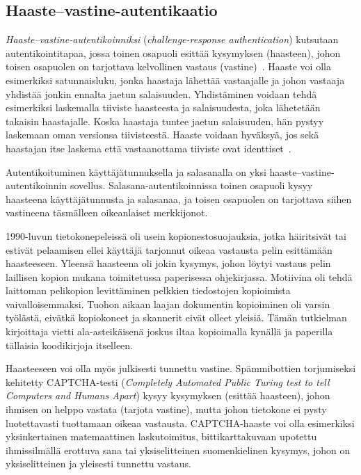 \documentclass[finnish,gradu]{tktltiki}
\begin{document}


  \subsection{Haaste--vastine-autentikaatio} %
  \label{sub:haaste_vastine_autentikaatio}

  \emph{Haaste--vastine-autentikoinniksi} (\emph{challenge-response authentication}) kutsutaan autentikointitapaa, jossa toinen osapuoli esittää kysymyksen (haasteen), johon toisen osapuolen on tarjottava kelvollinen vastaus (vastine)~\cite{NIST_SP800-63-1}. Haaste voi olla esimerkiksi satunnaisluku, jonka haastaja lähettää vastaajalle ja johon vastaaja yhdistää jonkin ennalta jaetun salaisuuden. Yhdistäminen voidaan tehdä esimerkiksi laskemalla tiiviste haasteesta ja salaisuudesta, joka lähetetään takaisin haastajalle. Koska haastaja tuntee jaetun salaisuuden, hän pystyy laskemaan oman versionsa tiivisteestä. Haaste voidaan hyväksyä, jos sekä haastajan itse laskema että vastaanottama tiiviste ovat identtiset~\cite{NIST_SP800-63-1}.

  Autentikoituminen käyttäjätunnuksella ja salasanalla on yksi haaste--vastine-autentikoinnin sovellus. Salasana-autentikoinnissa toinen osapuoli kysyy haasteena käyttäjätunnusta ja salasanaa, ja toisen osapuolen on tarjottava siihen vastineena täsmälleen oikeanlaiset merkkijonot.

  1990-luvun tietokonepeleissä oli usein kopionestosuojauksia, jotka häiritsivät tai estivät pelaamisen ellei käyttäjä tarjonnut oikeaa vastausta pelin esittämään haasteeseen. Yleensä haasteena oli jokin kysymys, johon löytyi vastaus pelin laillisen kopion mukana toimitetussa paperisessa ohjekirjassa. Motiivina oli tehdä laittoman pelikopion levittäminen pelkkien tiedostojen kopioimista vaivalloisemmaksi. Tuohon aikaan laajan dokumentin kopioiminen oli varsin työlästä, eivätkä kopiokoneet ja skannerit eivät olleet yleisiä. Tämän tutkielman kirjoittaja vietti ala-asteikäisenä joskus iltaa kopioimalla kynällä ja paperilla tällaisia koodikirjoja itselleen.

  Haasteeseen voi olla myös julkisesti tunnettu vastine. Spämmibottien torjumiseksi kehitetty CAPTCHA-testi (\emph{Completely Automated Public Turing test to tell Computers and Humans Apart}) kysyy kysymyksen (esittää haasteen), johon ihmisen on helppo vastata (tarjota vastine), mutta johon tietokone ei pysty luotettavasti tuottamaan oikeaa vastausta. CAPTCHA-haaste voi olla esimerkiksi yksinkertainen matemaattinen laskutoimitus, bittikarttakuvaan upotettu ihmissilmällä erottuva sana tai yksiselitteinen suomenkielinen kysymys, johon on yksiselitteinen ja yleisesti tunnettu vastaus.
\end{document}
